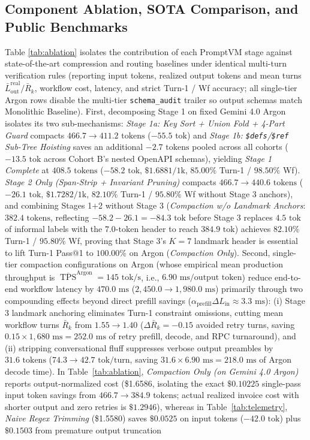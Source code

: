 \documentclass[conference,10pt]{IEEEtran}
\begin{document}
\subsection{Component Ablation, SOTA Comparison, and Public Benchmarks}
Table \ref{tab:ablation} isolates the contribution of each PromptVM stage against state-of-the-art compression and routing baselines under identical multi-turn verification rules (reporting input tokens, realized output tokens and mean turns $\bar{L}_{\text{out}}^{\text{real}} / \bar{R}_k$, workflow cost, latency, and strict Turn-1 / Wf accuracy; all single-tier Argon rows disable the multi-tier \texttt{schema\_audit} trailer so output schemas match Monolithic Baseline). First, decomposing Stage 1 on fixed Gemini 4.0 Argon isolates its two sub-mechanisms: \textit{Stage 1a: Key Sort + Union Fold + 4-Part Guard} compacts $466.7 \to 411.2\text{ tokens}$ ($-55.5\text{ tok}$) and \textit{Stage 1b: \texttt{\$defs}/\texttt{\$ref} Sub-Tree Hoisting} saves an additional $-2.7\text{ tokens}$ pooled across all cohorts ($-13.5\text{ tok}$ across Cohort B's nested OpenAPI schemas), yielding \textit{Stage 1 Complete} at $408.5\text{ tokens}$ ($-58.2\text{ tok}$, $\$1.6881/\text{1k}$, $85.00\%$ Turn-1 / $98.50\%$ Wf). \textit{Stage 2 Only (Span-Strip + Invariant Pruning)} compacts $466.7 \to 440.6\text{ tokens}$ ($-26.1\text{ tok}$, $\$1.7282/\text{1k}$, $82.10\%$ Turn-1 / $95.80\%$ Wf without Stage 3 anchors), and combining Stages 1+2 without Stage 3 (\textit{Compaction w/o Landmark Anchors}: $382.4\text{ tokens}$, reflecting $-58.2 - 26.1 = -84.3\text{ tok}$ before Stage 3 replaces $4.5\text{ tok}$ of informal labels with the $7.0\text{-token}$ header to reach $384.9\text{ tok}$) achieves $82.10\%$ Turn-1 / $95.80\%$ Wf, proving that Stage 3's $K=7$ landmark header is essential to lift Turn-1 Pass@1 to $100.00\%$ on Argon (\textit{Compaction Only}). Second, single-tier compaction configurations on Argon (whose empirical mean production throughput is $\overline{\operatorname{TPS}}^{\text{Argon}} = 145\text{ tok/s}$, i.e., $6.90\text{ ms/output token}$) reduce end-to-end workflow latency by $470.0\text{ ms}$ ($2{,}450.0 \to 1{,}980.0\text{ ms}$) primarily through two compounding effects beyond direct prefill savings ($\alpha_{\text{prefill}} \Delta L_{\text{in}} \approx 3.3\text{ ms}$): (i) Stage 3 landmark anchoring eliminates Turn-1 constraint omissions, cutting mean workflow turns $\bar{R}_k$ from $1.55 \to 1.40$ ($\Delta \bar{R}_k = -0.15$ avoided retry turns, saving $0.15 \times 1{,}680\text{ ms} = 252.0\text{ ms}$ of retry prefill, decode, and RPC turnaround), and (ii) stripping conversational fluff suppresses verbose output preambles by $31.6\text{ tokens}$ ($74.3 \to 42.7\text{ tok/turn}$, saving $31.6 \times 6.90\text{ ms} = 218.0\text{ ms}$ of Argon decode time). In Table~\ref{tab:ablation}, \textit{Compaction Only (on Gemini 4.0 Argon)} reports output-normalized cost (\$1.6586, isolating the exact $\$0.10225$ single-pass input token savings from $466.7 \to 384.9\text{ tokens}$; actual realized invoice cost with shorter output and zero retries is $\$1.2946$), whereas in Table~\ref{tab:telemetry}, \textit{Naive Regex Trimming} (\$1.5580) saves $\$0.0525$ on input tokens ($-42.0\text{ tok}$) plus $\$0.1503$ from premature output truncation 
\end{document}
